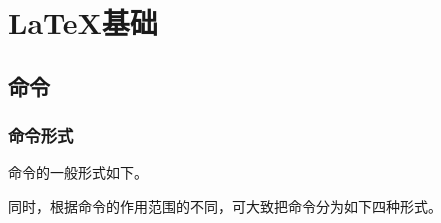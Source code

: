 {\let\clearpage\relax \chapter{\LaTeX 基础}}

\section{命令}

\subsection{命令形式}

命令的一般形式如下。

\begin{latex}{}
\end{latex}

同时，根据命令的作用范围的不同，可大致把命令分为如下四种形式。

